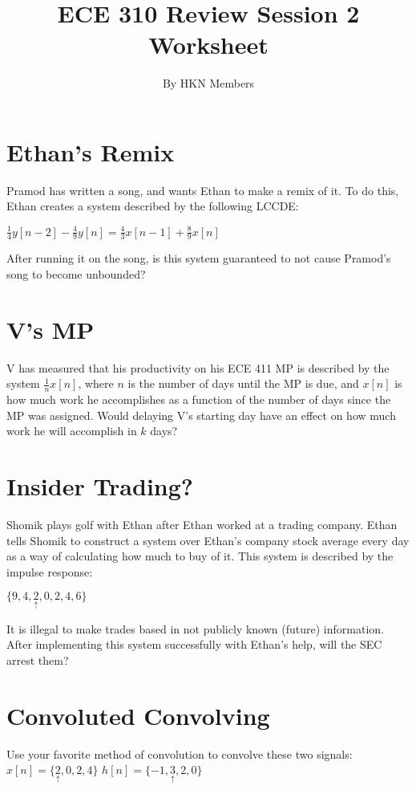\documentclass{article}
\title{ECE 310 Review Session 2 Worksheet}
\author{By HKN Members}
\date{}
\begin{document}
\maketitle

\section{Ethan's Remix}
Pramod has written a song, and wants Ethan to make a remix of it. To do this, Ethan creates a system described by the following LCCDE:

$ \frac{1}{4} y[n-2] - \frac{4}{9} y[n] = \frac{4}{3} x[n-1] + \frac{8}{9} x[n]$

After running it on the song, is this system guaranteed to not cause Pramod's song to become unbounded?

\section{V's MP}
V has measured that his productivity on his ECE 411 MP is described by the system $\frac{1}{n} x[n]$, where $n$ is the number of days until the MP is due, and $x[n]$ is how much work he accomplishes as a function of the number of days since the MP was assigned. Would delaying V's starting day have an effect on how much work he will accomplish in $k$ days?

\section{Insider Trading?}

Shomik plays golf with Ethan after Ethan worked at a trading company. Ethan tells Shomik to construct a system over Ethan's company stock average every day as a way of calculating how much to buy of it. This system is described by the impulse response:

$\{9,4,\underset{\uparrow}{2},0,2,4,6\}$


It is illegal to make trades based in not publicly known (future) information. After implementing this system successfully with Ethan's help, will the SEC arrest them?

\section{Convoluted Convolving}
Use your favorite method of convolution to convolve these two signals:
\newline
\indent \indent \indent \indent 
$x[n]=\{\underset{\uparrow}{2},0,2,4\}$ \indent \indent $h[n]=\{-1,\underset{\uparrow}{3},2,0\}$
\end{document}
